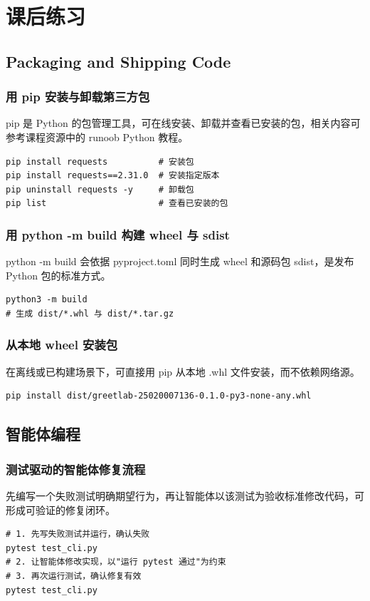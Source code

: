 \section{课后练习}

\subsection{Packaging and Shipping Code}

\subsubsection{用 pip 安装与卸载第三方包}
pip 是 Python 的包管理工具，可在线安装、卸载并查看已安装的包，相关内容可参考课程资源中的 runoob Python 教程。
\begin{verbatim}
pip install requests          # 安装包
pip install requests==2.31.0  # 安装指定版本
pip uninstall requests -y     # 卸载包
pip list                      # 查看已安装的包
\end{verbatim}

\subsubsection{用 python -m build 构建 wheel 与 sdist}
python -m build 会依据 pyproject.toml 同时生成 wheel 和源码包 sdist，是发布 Python 包的标准方式。
\begin{verbatim}
python3 -m build
# 生成 dist/*.whl 与 dist/*.tar.gz
\end{verbatim}

\subsubsection{从本地 wheel 安装包}
在离线或已构建场景下，可直接用 pip 从本地 .whl 文件安装，而不依赖网络源。
\begin{verbatim}
pip install dist/greetlab-25020007136-0.1.0-py3-none-any.whl
\end{verbatim}

\subsection{智能体编程}

\subsubsection{测试驱动的智能体修复流程}
先编写一个失败测试明确期望行为，再让智能体以该测试为验收标准修改代码，可形成可验证的修复闭环。
\begin{verbatim}
# 1. 先写失败测试并运行，确认失败
pytest test_cli.py
# 2. 让智能体修改实现，以"运行 pytest 通过"为约束
# 3. 再次运行测试，确认修复有效
pytest test_cli.py
\end{verbatim}

